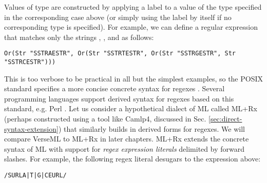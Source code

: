 Values of type  are constructed by applying a label to a value of the type specified in the corresponding case above (or simply using the label by itself if no corresponding type is specified). For example, we can define a regular expression that matches only the strings , ,  and  as follows:
\begin{lstlisting}[numbers=none]
Or(Str "SSTRAESTR", Or(Str "SSTRTESTR", Or(Str "SSTRGESTR", Str "SSTRCESTR")))
\end{lstlisting}

This is too verbose to be practical  in all but the simplest examples, so the POSIX standard specifies a more concise concrete syntax for regexes \cite{STD95954}. Several programming languages support derived syntax for regexes based on this standard, e.g. Perl \cite{books/daglib/0028711}. Let us consider a hypothetical dialect of ML called ML+Rx (perhaps constructed using a tool like Camlp4, discussed in Sec. \ref{sec:direct-syntax-extension}) that similarly builds in derived forms for regexes. We will compare VerseML to ML+Rx in later chapters. ML+Rx extends the concrete syntax of ML with support for \emph{regex expression literals} delimited by forward slashes. For example, the following regex literal desugars to the expression above:
\begin{lstlisting}[numbers=none]
/SURLA|T|G|CEURL/
\end{lstlisting}

